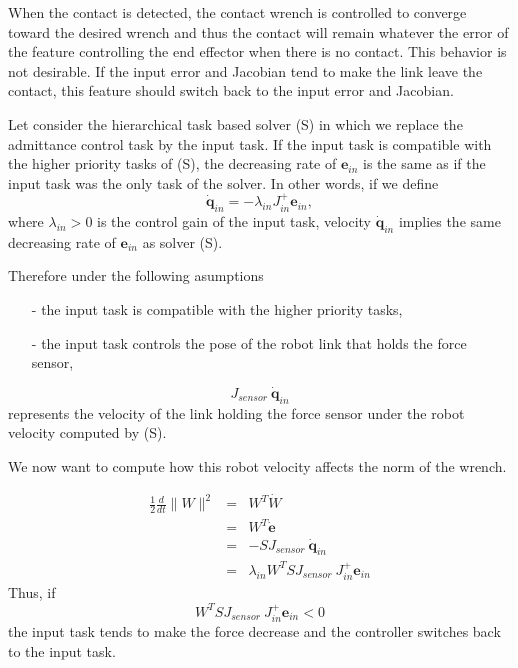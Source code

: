 \documentclass{article}
\newcommand\dconf{\mathbf{\dot{q}}}
\newcommand\error{\mathbf{e}}
\newcommand\derror{\mathbf{\dot{e}}}
\begin{document}
When the contact is detected, the contact wrench is controlled to converge toward the desired wrench and thus the contact will remain whatever the error of the feature controlling the end effector when there is no contact.
This behavior is not desirable. If the input error and Jacobian tend to make
the link leave the contact, this feature should switch back to the input error and Jacobian.

Let consider the hierarchical task based solver (S) in which we replace the
admittance control task by the input task. If the input task is compatible
with the higher priority tasks of (S), the decreasing rate of $\error_{in}$ is
the same as if the input task was the only task of the solver. In other words, if we define
$$
\dconf_{in} = -\lambda_{in} J_{in}^{+}\error_{in},
$$
where $\lambda_{in} > 0$ is the control gain of the input task, velocity $\dconf_{in}$ implies the same decreasing rate of $\error_{in}$ as solver (S).

Therefore under the following asumptions
\begin{itemize}
\item[-] the input task is compatible with the higher priority tasks,
\item[-] the input task controls the pose of the robot link that holds the
force sensor,
\end{itemize}
$$
J_{sensor}\ \dconf_{in}
$$
represents the velocity of the link holding the force sensor under the robot
velocity computed by (S).

We now want to compute how this robot velocity affects the norm of the wrench.

\begin{eqnarray*}
  \frac{1}{2}\frac{d}{dt}\|W\|^2 &=& W^T\dot{W} \\
  &=& W^T\derror \\
  &=& -S J_{sensor}\ \dconf_{in} \\
  &=& \lambda_{in} W^T S J_{sensor}\ J_{in}^{+}\error_{in}
\end{eqnarray*}
Thus, if
$$
W^T S J_{sensor}\ J_{in}^{+}\error_{in} < 0
$$
the input task tends to make the force decrease and the controller switches back to the input task.
\end{document}

